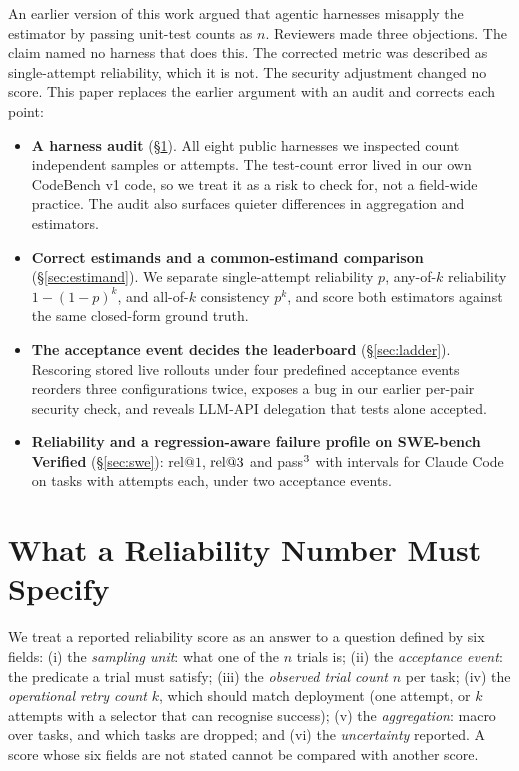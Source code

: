 \documentclass[11pt,a4paper]{article}
\makeatletter
\newcommand{\relk}[1]{\mathrm{rel}@#1}
\makeatother
\begin{document}
An earlier version of this work \citep{jiang2026beyond} argued that agentic harnesses misapply the estimator by passing unit-test counts as $n$. Reviewers made three objections. The claim named no harness that does this. The corrected metric was described as single-attempt reliability, which it is not. The security adjustment changed no score. This paper replaces the earlier argument with an audit and corrects each point:

\begin{itemize}
  \item \textbf{A harness audit} (\S\ref{sec:audit}). All eight public harnesses we inspected count independent samples or attempts. The test-count error lived in our own CodeBench v1 code, so we treat it as a risk to check for, not a field-wide practice. The audit also surfaces quieter differences in aggregation and estimators.
  \item \textbf{Correct estimands and a common-estimand comparison} (\S\ref{sec:estimand}). We separate single-attempt reliability $p$, any-of-$k$ reliability $1-(1-p)^k$, and all-of-$k$ consistency $p^k$, and score both estimators against the same closed-form ground truth.
  \item \textbf{The acceptance event decides the leaderboard} (\S\ref{sec:ladder}). Rescoring stored live rollouts under four predefined acceptance events reorders three configurations twice, exposes a bug in our earlier per-pair security check, and reveals LLM-API delegation that tests alone accepted.
  \item \textbf{Reliability and a regression-aware failure profile on SWE-bench Verified} (\S\ref{sec:swe}): $\relk{1}$, $\relk{\sweAttempts}$ and pass$^{3}$ with intervals for Claude Code on \sweNTasks{} tasks with \sweAttempts{} attempts each, under two acceptance events.
\end{itemize}

\section{What a Reliability Number Must Specify}
\label{sec:audit}

We treat a reported reliability score as an answer to a question defined by six fields:
(i) the \emph{sampling unit}: what one of the $n$ trials is;
(ii) the \emph{acceptance event}: the predicate a trial must satisfy;
(iii) the \emph{observed trial count} $n$ per task;
(iv) the \emph{operational retry count} $k$, which should match deployment (one attempt, or $k$ attempts with a selector that can recognise success);
(v) the \emph{aggregation}: macro over tasks, and which tasks are dropped; and
(vi) the \emph{uncertainty} reported.
A score whose six fields are not stated cannot be compared with another score.
\end{document}

